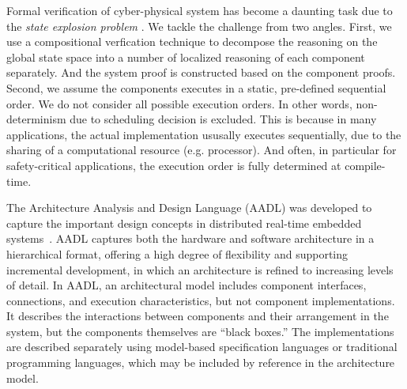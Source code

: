 
Formal verification of cyber-physical system has become a daunting task due to the \emph{state explosion problem} \cite{Clarke2012}. We tackle the challenge from two angles. First, we use a compositional verfication technique to decompose the reasoning on the global state space into a number of localized reasoning of each component separately. And the system proof is constructed based on the component proofs. Second, we assume the components executes in a static, pre-defined sequential order. We do not consider all possible execution orders. In other words, non-determinism due to scheduling decision is excluded. This is because in many applications, the actual implementation ususally executes sequentially, due to the sharing of a computational resource (e.g. processor). And often, in particular for safety-critical applications, the execution order is fully determined at compile-time. 

The Architecture Analysis and Design Language (AADL) was developed to capture the important design concepts in distributed real-time embedded systems~\cite{FeilerModelBasedEngineering2012}. 
AADL captures both the hardware and software architecture in a hierarchical format,  
offering a high degree of flexibility and supporting incremental development, in which an architecture is refined to increasing levels of detail.
%
In AADL, an architectural model includes component interfaces, connections, and execution characteristics, but not component implementations. It describes the interactions between components and their arrangement in the system, but the components themselves are ``black boxes.'' The implementations are described separately using model-based specification languages or traditional programming languages, which may be included by reference in the architecture model.  

